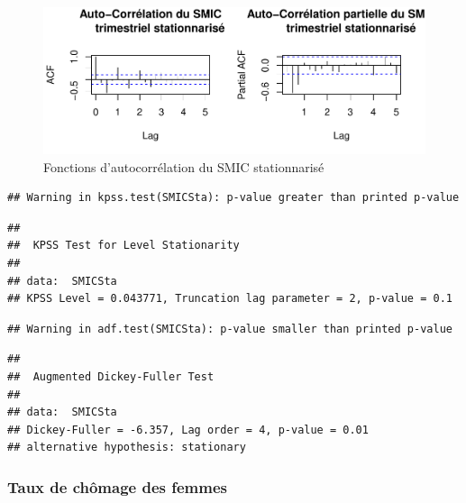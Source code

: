 \documentclass[11pt,]{article}
\begin{document}
\begin{figure}[htbp]
\centering
\includegraphics{Rapport_final_files/figure-latex/unnamed-chunk-19-1.pdf}
\caption{\label{fig16} Fonctions d'autocorrélation du SMIC
stationnarisé}
\end{figure}

\begin{verbatim}
## Warning in kpss.test(SMICSta): p-value greater than printed p-value
\end{verbatim}

\begin{verbatim}
## 
##  KPSS Test for Level Stationarity
## 
## data:  SMICSta
## KPSS Level = 0.043771, Truncation lag parameter = 2, p-value = 0.1
\end{verbatim}

\begin{verbatim}
## Warning in adf.test(SMICSta): p-value smaller than printed p-value
\end{verbatim}

\begin{verbatim}
## 
##  Augmented Dickey-Fuller Test
## 
## data:  SMICSta
## Dickey-Fuller = -6.357, Lag order = 4, p-value = 0.01
## alternative hypothesis: stationary
\end{verbatim}

\newpage

\subsubsection{Taux de chômage des
femmes}\label{taux-de-chomage-des-femmes-1}
\end{document}
